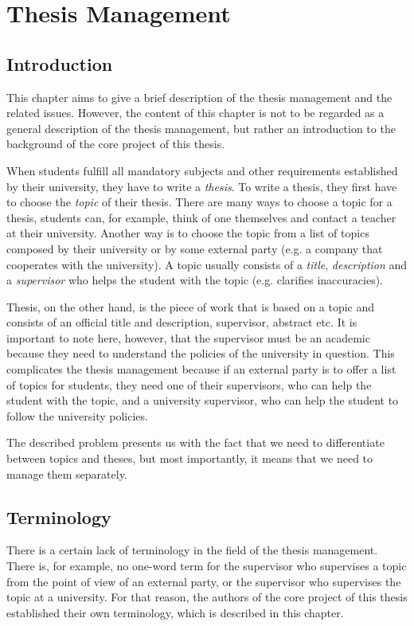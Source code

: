 \chapter{Thesis Management}

\section{Introduction}

This chapter aims to give a brief description of the thesis management and the related issues. However, the content of this chapter is not to be regarded as a general description of the thesis management, but rather an introduction to the background of the core project of this thesis.

When students fulfill all mandatory subjects and other requirements established by their university, they have to write a \emph{thesis}. To write a thesis, they first have to choose the \emph{topic} of their thesis. There are many ways to choose a topic for a thesis, students can, for example, think of one themselves and contact a teacher at their university. Another way is to choose the topic from a list of topics composed by their university or by some external party (e.g. a company that cooperates with the university). A topic usually consists of a \emph{title}, \emph{description} and a \emph{supervisor} who helps the student with the topic (e.g. clarifies inaccuracies).

Thesis, on the other hand, is the piece of work that is based on a topic and consists of an official title and description, supervisor, abstract etc. It is important to note here, however, that the supervisor must be an academic because they need to understand the policies of the university in question. This complicates the thesis management because if an external party is to offer a list of topics for students, they need one of their supervisors, who can help the student with the topic, and a university supervisor, who can help the student to follow the university policies.

The described problem presents us with the fact that we need to differentiate between topics and theses, but most importantly, it means that we need to manage them separately.

\section{Terminology}

There is a certain lack of terminology in the field of the thesis management. There is, for example, no one-word term for the supervisor who supervises a topic from the point of view of an external party, or the supervisor who supervises the topic at a university. For that reason, the authors of the core project of this thesis established their own terminology, which is described in this chapter.

